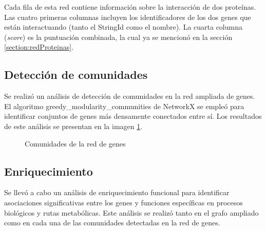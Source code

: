Cada fila de esta red contiene información sobre la interacción de dos proteínas. Las cuatro primeras columnas incluyen los identificadores de los dos genes que están interactuando (tanto el StringId como el nombre). La cuarta columna (\textit{score}) es la puntuación combinada, la cual ya se mencionó en la sección \ref{section:redProteinas}.


\subsection{Detección de comunidades}

Se realizó un análisis de detección de comunidades en la red ampliada de genes. El algoritmo greedy\_modularity\_communities de NetworkX se empleó para identificar conjuntos de genes más densamente conectados entre sí. Los resultados de este análisis se presentan en la imagen \ref{fig:comunidades}.

\begin{figure}[h!]
	\centering
	\caption{Comunidades de la red de genes}
	\label{fig:comunidades}
\end{figure}


\subsection{Enriquecimiento}

Se llevó a cabo un análisis de enriquecimiento funcional para identificar asociaciones significativas entre los genes y funciones específicas en procesos biológicos y rutas metabólicas. Este análisis se realizó tanto en el grafo ampliado como en cada una de las comunidades detectadas en la red de genes.


